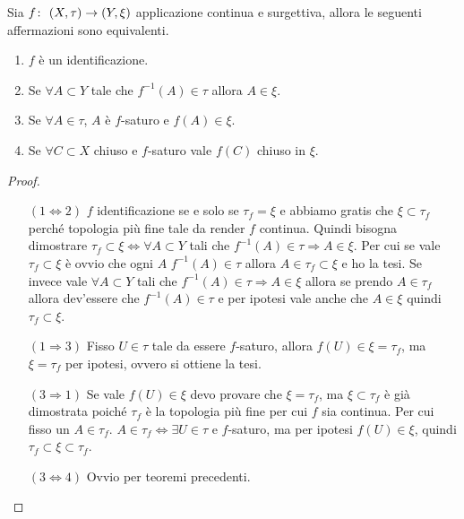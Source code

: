 \begin{theorem}
	\label{crtident}
	Sia $f \colon\ (X,\tau) \rightarrow (Y, \xi)$ applicazione continua e surgettiva, allora le seguenti affermazioni sono equivalenti.
	\begin{enumerate}
		\item $f$ è un identificazione.
		\item Se $\forall A \subset Y$  tale che $f^{-1}(A) \in \tau$ allora $A \in \xi$.
		\item Se $\forall A \in \tau$, $A$ è $f$-saturo e $f(A) \in \xi$.
		\item Se $\forall C \subset X$ chiuso e $f$-saturo vale $f(C)$ chiuso in $\xi$.
	\end{enumerate}
\end{theorem}
\begin{proof}
	\begin{enumerate}
		\item[$(1 \Leftrightarrow 2)$] $f$ identificazione se e solo se $\tau_f = \xi$ e abbiamo gratis che $\xi \subset \tau_f$ perché topologia più fine tale da render $f$ continua. Quindi bisogna dimostrare $\tau_f \subset \xi \Longleftrightarrow \forall A \subset Y$ tali che $f^{-1}(A) \in \tau \Rightarrow A \in \xi$. Per cui se vale $\tau_f \subset \xi$ è ovvio che ogni $A$ $f^{-1}(A) \in \tau$ allora $A \in \tau_f \subset \xi$ e ho la tesi. Se invece vale $\forall A \subset Y$ tali che $f^{-1}(A) \in \tau \Rightarrow A \in \xi$ allora se prendo $A \in \tau_f$ allora dev'essere che $f^{-1}(A) \in \tau$ e per ipotesi vale anche che $A \in \xi$ quindi $\tau_f \subset \xi$. 
		\item[$(1 \Rightarrow 3)$] Fisso $U \in \tau$ tale da essere $f$-saturo, allora $f(U) \in \xi = \tau_f$, ma $\xi = \tau_f$ per ipotesi, ovvero si ottiene la tesi.
		\item[$(3 \Rightarrow 1)$] Se vale $f(U) \in \xi$ devo provare che $\xi = \tau_f$, ma $\xi \subset \tau_f$ è già dimostrata poiché $\tau_f$ è la topologia più fine per cui $f$ sia continua. Per cui fisso un $A \in \tau_f$. $A \in \tau_f \Leftrightarrow \exists U \in \tau$ e $f$-saturo, ma per ipotesi $f(U) \in \xi$, quindi $\tau_f \subset \xi \subset \tau_f$.
		\item[$(3\Leftrightarrow 4)$] Ovvio per teoremi precedenti.
	\end{enumerate}
\end{proof}


